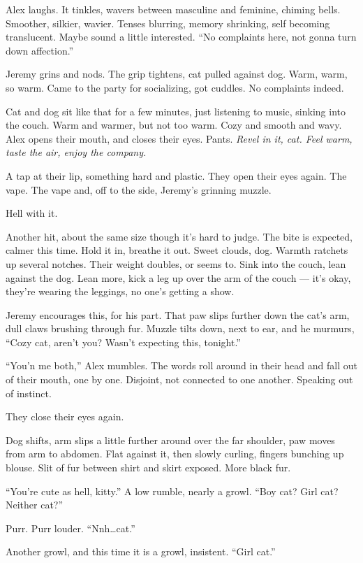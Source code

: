 Alex laughs. It tinkles, wavers between masculine and feminine, chiming bells. Smoother, silkier, wavier. Tenses blurring, memory shrinking, self becoming translucent. Maybe sound a little interested. ``No complaints here, not gonna turn down affection.''

Jeremy grins and nods. The grip tightens, cat pulled against dog. Warm, warm, so warm. Came to the party for socializing, got cuddles. No complaints indeed.

Cat and dog sit like that for a few minutes, just listening to music, sinking into the couch. Warm and warmer, but not too warm. Cozy and smooth and wavy. Alex opens their mouth, and closes their eyes. Pants. \emph{Revel in it, cat. Feel warm, taste the air, enjoy the company.}

A tap at their lip, something hard and plastic. They open their eyes again. The vape. The vape and, off to the side, Jeremy's grinning muzzle.

Hell with it.

Another hit, about the same size though it's hard to judge. The bite is expected, calmer this time. Hold it in, breathe it out. Sweet clouds, dog. Warmth ratchets up several notches. Their weight doubles, or seems to. Sink into the couch, lean against the dog. Lean more, kick a leg up over the arm of the couch --- it's okay, they're wearing the leggings, no one's getting a show.

Jeremy encourages this, for his part. That paw slips further down the cat's arm, dull claws brushing through fur. Muzzle tilts down, next to ear, and he murmurs, ``Cozy cat, aren't you? Wasn't expecting this, tonight.''

``You'n me both,'' Alex mumbles. The words roll around in their head and fall out of their mouth, one by one. Disjoint, not connected to one another. Speaking out of instinct.

They close their eyes again.

Dog shifts, arm slips a little further around over the far shoulder, paw moves from arm to abdomen. Flat against it, then slowly curling, fingers bunching up blouse. Slit of fur between shirt and skirt exposed. More black fur.

``You're cute as hell, kitty.'' A low rumble, nearly a growl. ``Boy cat? Girl cat? Neither cat?''

Purr. Purr louder. ``Nnh\ldots{}cat.''

Another growl, and this time it is a growl, insistent. ``Girl cat.''

